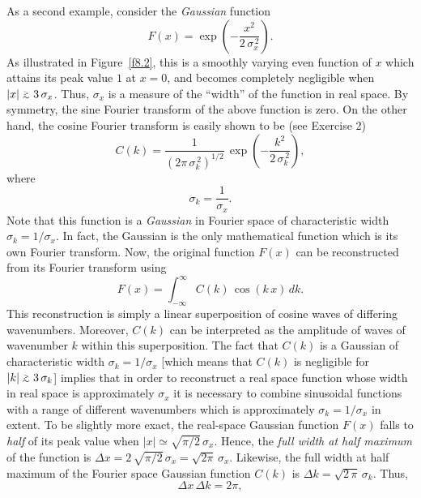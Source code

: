 As a second example, consider the {\em Gaussian}\/ function 
\begin{equation}\label{e8.15}
F(x) =\exp\left(-\frac{x^2}{2\,\sigma_x^{\,2}}\right).
\end{equation}
As illustrated in Figure~\ref{f8.2}, this is a smoothly varying  even function of $x$ which attains
its peak value $1$ at $x=0$, and becomes completely negligible when $|x|\stackrel {_{\normalsize>}}{_{\normalsize \sim}} 3\,\sigma_x$. Thus, $\sigma_x$ is a measure of the ``width'' of the function in real  space.
By symmetry, the sine Fourier transform of the above function is zero. On the
other hand, the cosine Fourier transform is easily shown to be (see Exercise 2)
\begin{equation}\label{e8.16}
C(k) = \frac{1}{(2\pi\,\sigma_k^{\,2})^{1/2}}\,\exp\left(-\frac{k^2}{2\,\sigma_k^{\,2}}\right),
\end{equation}
where
\begin{equation}
\sigma_k=\frac{1}{\sigma_x}.
\end{equation}
Note that this function is a {\em Gaussian}\/ in Fourier space of characteristic width $\sigma_k=1/\sigma_x$. 
In fact, the Gaussian is the only mathematical function which is its
own Fourier transform. Now, the original function $F(x)$ can be reconstructed from
its Fourier transform using
\begin{equation}\label{e8.18}
F(x)=\int_{-\infty}^\infty C(k)\,\cos(k\,x)\,dk.
\end{equation}
This reconstruction is simply a linear superposition of cosine waves of differing wavenumbers. Moreover, $C(k)$ can be interpreted as  the amplitude of waves of wavenumber $k$ within  this superposition. The fact that $C(k)$ is a Gaussian of
characteristic width $\sigma_k=1/\sigma_x$ [which means that $C(k)$ is negligible for $|k|\stackrel {_{\normalsize>}}{_{\normalsize \sim}} 3\,\sigma_k$] implies that in order to reconstruct a real space function whose
width in real space is approximately $\sigma_x$ it is necessary to combine sinusoidal functions
with a range of different wavenumbers which is approximately $\sigma_k=1/\sigma_x$ in extent. To be slightly more exact, the real-space Gaussian function $F(x)$ falls to
{\em half}\/ of its peak value when $|x|\simeq \sqrt{\pi/2}\,\sigma_x$. Hence, the {\em full width at half maximum}\/ of the function is $\Delta x = 2\,\sqrt{\pi/2}\,\sigma_x=\sqrt{2\pi}\,\sigma_x$. Likewise, the full width at half maximum of the Fourier space Gaussian function $C(k)$ is $\Delta k =\sqrt{2\,\pi}\,\sigma_k$. 
Thus, 
\begin{equation}
\Delta x\,\Delta k = 2\pi,
\end{equation}
